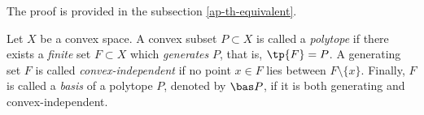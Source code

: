 \documentclass[12pt, a4paper]{article}
\begin{document}

The proof is provided in the subsection \ref{ap-th-equivalent}.

\begin{definition}[Polytope]\label{def-poly}
    Let \(X\) be a convex space. A convex subset \(P \subset X\) is called a \textit{polytope} if there exists a \textit{finite} set \(F \subset X\) which \textit{generates} \(P\), that is, \(\tp{F} = P\). A generating set \(F\) is called \textit{convex-independent} if no point \(x \in F\) lies between \(F \setminus \{x\}\). Finally, \(F\) is called a \textit{basis} of a polytope \(P\), denoted by \(\bas P\), if it is both generating and convex-independent.
\end{definition}
\end{document}
